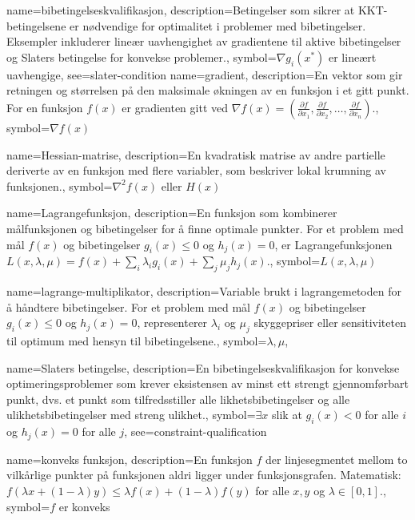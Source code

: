 {
    name=bibetingelseskvalifikasjon,
    description={Betingelser som sikrer at KKT-betingelsene er nødvendige for optimalitet i problemer med bibetingelser. Eksempler inkluderer lineær uavhengighet av gradientene til aktive bibetingelser og Slaters betingelse for konvekse problemer.},
    symbol={\( \nabla g_i(x^*) \) er lineært uavhengige},
    see={slater-condition}
}
{
    name=gradient,
    description={En vektor som gir retningen og størrelsen på den maksimale økningen av en funksjon i et gitt punkt. For en funksjon \( f(x) \) er gradienten gitt ved \( \nabla f(x) = (\frac{\partial f}{\partial x_1}, \frac{\partial f}{\partial x_2}, \ldots, \frac{\partial f}{\partial x_n}) \).},
    symbol={\( \nabla f(x) \)}
}

{
    name=Hessian-matrise,
    description={En kvadratisk matrise av andre partielle deriverte av en funksjon med flere variabler, som beskriver lokal krumning av funksjonen.},
    symbol={\( \nabla^2 f(x) \) eller \( H(x) \)}
}

{
    name=Lagrangefunksjon,
    description={En funksjon som kombinerer målfunksjonen og bibetingelser for å finne optimale punkter. For et problem med mål \( f(x) \) og bibetingelser \( g_i(x) \leq 0 \) og \( h_j(x) = 0 \), er Lagrangefunksjonen \( L(x, \lambda, \mu) = f(x) + \sum_{i} \lambda_i g_i(x) + \sum_{j} \mu_j h_j(x) \).},
    symbol={\( L(x,\lambda,\mu) \)}
}

{
    name=lagrange-multiplikator,
    description={Variable brukt i lagrangemetoden for å håndtere bibetingelser. For et problem med mål \( f(x) \) og bibetingelser \( g_i(x) \leq 0 \) og \( h_j(x) = 0 \), representerer \( \lambda_i \) og \( \mu_j \) skyggepriser eller sensitiviteten til optimum med hensyn til bibetingelsene.},
    symbol={\( \lambda, \mu \)},
}

{
    name={Slaters betingelse},
    description={En bibetingelseskvalifikasjon for konvekse optimeringsproblemer som krever eksistensen av minst ett strengt gjennomførbart punkt, dvs. et punkt som tilfredsstiller alle likhetsbibetingelser og alle ulikhetsbibetingelser med streng ulikhet.},
    symbol={\( \exists x \) slik at \( g_i(x) < 0 \) for alle \( i \) og \( h_j(x) = 0 \) for alle \( j \)},
    see={constraint-qualification}
}

{
    name=konveks funksjon,
    description={En funksjon \( f \) der linjesegmentet mellom to vilkårlige punkter på funksjonen aldri ligger under funksjonsgrafen. Matematisk: \( f(\lambda x + (1-\lambda)y) \leq \lambda f(x) + (1-\lambda)f(y) \) for alle \( x, y \) og \( \lambda \in [0,1] \).},
    symbol={\( f \) er konveks}
}

